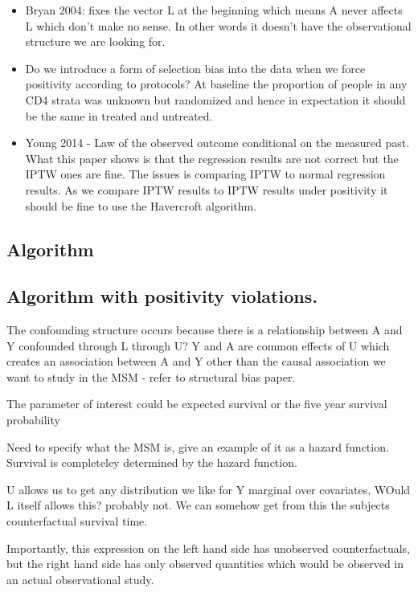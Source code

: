 \documentclass[11pt]{article}
\providecommand{\tightlist}{%
      \setlength{\itemsep}{0pt}\setlength{\parskip}{0pt}}
\begin{document}
\begin{itemize}
\tightlist
\item
  Bryan 2004: fixes the vector L at the beginning which means A never
  affects L which don't make no sense. In other words it doesn't have
  the observational structure we are looking for.
\item
  Do we introduce a form of selection bias into the data when we force
  positivity according to protocols? At baseline the proportion of
  people in any CD4 strata was unknown but randomized and hence in
  expectation it should be the same in treated and untreated.
\item
  Young 2014 - Law of the observed outcome conditional on the measured
  past. What this paper shows is that the regression results are not
  correct but the IPTW ones are fine. The issues is comparing IPTW to
  normal regression results. As we compare IPTW results to IPTW results
  under positivity it should be fine to use the Havercroft algorithm.
\end{itemize}

\subsection{Algorithm}\label{algorithm}

\subsection{Algorithm with positivity
violations.}\label{algorithm-with-positivity-violations.}

The confounding structure occurs because there is a relationship between
A and Y confounded through L through U? Y and A are common effects of U
which creates an association between A and Y other than the causal
association we want to study in the MSM - refer to structural bias
paper.

The parameter of interest could be expected survival or the five year
survival probability

Need to specify what the MSM is, give an example of it as a hazard
function. Survival is completeley determined by the hazard function.

U allows us to get any distribution we like for Y marginal over
covariates, WOuld L itself allows this? probably not. We can somehow get
from this the subjects counterfactual survival time.

Importantly, this expression on the left hand side has unobserved
counterfactuals, but the right hand side has only observed quantities
which would be observed in an actual observational study.
\end{document}
